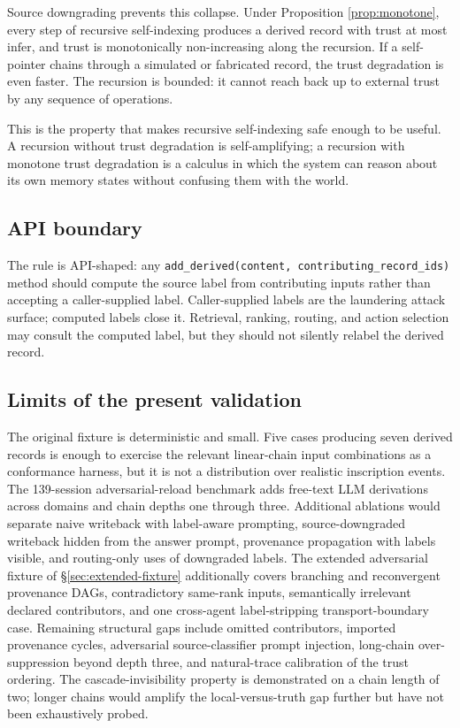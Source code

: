 \documentclass[11pt]{article}
\newcommand{\infer}{\ensuremath{\mathrm{infer}}}
\begin{document}
Source downgrading prevents this collapse. Under Proposition \ref{prop:monotone}, every step of recursive self-indexing produces a derived record with trust at most $\infer$, and trust is monotonically non-increasing along the recursion. If a self-pointer chains through a simulated or fabricated record, the trust degradation is even faster. The recursion is bounded: it cannot reach back up to external trust by any sequence of operations.

This is the property that makes recursive self-indexing safe enough to be useful. A recursion without trust degradation is self-amplifying; a recursion with monotone trust degradation is a calculus in which the system can reason about its own memory states without confusing them with the world.

\subsection{API boundary}

The rule is API-shaped: any \texttt{add\_derived(content, contributing\_record\_ids)} method should compute the source label from contributing inputs rather than accepting a caller-supplied label. Caller-supplied labels are the laundering attack surface; computed labels close it. Retrieval, ranking, routing, and action selection may consult the computed label, but they should not silently relabel the derived record.

\subsection{Limits of the present validation}

The original fixture is deterministic and small. Five cases producing seven derived records is enough to exercise the relevant linear-chain input combinations as a conformance harness, but it is not a distribution over realistic inscription events. The 139-session adversarial-reload benchmark adds free-text LLM derivations across domains and chain depths one through three. Additional ablations would separate naive writeback with label-aware prompting, source-downgraded writeback hidden from the answer prompt, provenance propagation with labels visible, and routing-only uses of downgraded labels. The extended adversarial fixture of \S\ref{sec:extended-fixture} additionally covers branching and reconvergent provenance DAGs, contradictory same-rank inputs, semantically irrelevant declared contributors, and one cross-agent label-stripping transport-boundary case. Remaining structural gaps include omitted contributors, imported provenance cycles, adversarial source-classifier prompt injection, long-chain over-suppression beyond depth three, and natural-trace calibration of the trust ordering. The cascade-invisibility property is demonstrated on a chain length of two; longer chains would amplify the local-versus-truth gap further but have not been exhaustively probed.
\end{document}
